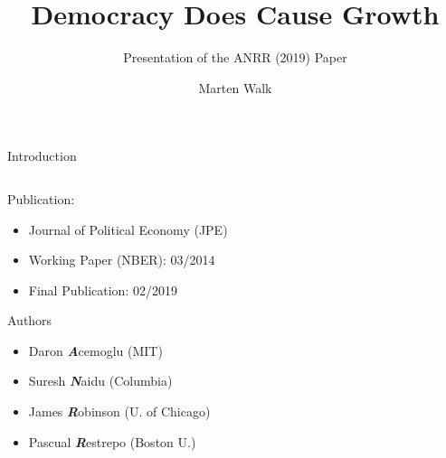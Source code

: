 \documentclass[
  ignorenonframetext,
]{beamer}
\title{Democracy Does Cause Growth}
\subtitle{Presentation of the ANRR (2019) Paper}
\author{Marten Walk}
\date{}
\institute{Empirical Economics}
\providecommand{\tightlist}{%
  \setlength{\itemsep}{0pt}\setlength{\parskip}{0pt}}\usepackage{longtable,booktabs,array}
\begin{document}
\frame{\titlepage}
\ifdefined\Shaded\renewenvironment{Shaded}{\begin{tcolorbox}[frame hidden, sharp corners, interior hidden, borderline west={3pt}{0pt}{shadecolor}, breakable, enhanced, boxrule=0pt]}{\end{tcolorbox}}\fi

\begin{frame}{Introduction}
\protect\hypertarget{introduction}{}
\begin{columns}[T]
\begin{column}{0.6\textwidth}
\hfill\break

Publication:

\begin{itemize}
\tightlist
\item
  Journal of Political Economy (JPE)
\item
  Working Paper (NBER): 03/2014
\item
  Final Publication: 02/2019
\end{itemize}

\hfill\break

Authors

\begin{itemize}
\tightlist
\item
  Daron \textbf{\emph{A}}cemoglu (MIT)
\item
  Suresh \textbf{\emph{N}}aidu (Columbia)
\item
  James \textbf{\emph{R}}obinson (U. of Chicago)
\item
  Pascual \textbf{\emph{R}}estrepo (Boston U.)
\end{itemize}
\end{column}

\begin{column}{0.4\textwidth}
\begin{figure}


\end{figure}
\end{column}
\end{columns}
\end{frame}
\end{document}
